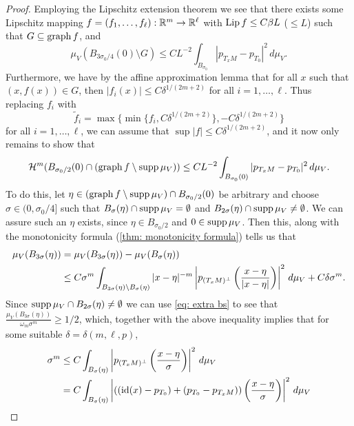 \begin{proof}
Employing the Lipschitz extension theorem we see that there exists some Lipschitz mapping $f=(f_1,\dots, f_{\ell}):\mathbb{R}^m \to \mathbb{R}^{\ell}$ with $\operatorname{Lip} f \le C\beta L$ ($\le L$) such that $G \subseteq \operatorname{graph} f$, and
\begin{equation}
    \mu_V(B_{3\sigma_0/4}(0) \setminus G) \le CL^{-2} \int_{B_{\sigma_0}} |p_{T_xM} - p_{T_0}|^2\, d\mu_V.\label{eq: final use}
\end{equation}
Furthermore, we have by the affine approximation lemma that for all $x$ such that $(x,f(x)) \in G$, then $|f_i(x)| \le C\delta^{1/(2m+2)}$ for all $i = 1, \dots, \ell$. Thus replacing $f_i$ with 
\[
    \tilde f_i = \max\{\min\{ f_i, C\delta^{1/(2m+2)} \}, -C\delta^{1/(2m+2)}\}
\]
for all $i = 1, \dots, \ell$, we can assume that $\sup|f| \le C\delta^{1/(2m+2)}$, and it now only remains to show that
\begin{equation}
    \mathcal{H}^m(B_{\sigma_0/2}(0) \cap (\operatorname{graph} f \setminus \operatorname{supp} \mu_V)) \le CL^{-2} \int_{B_{\sigma_0}(0) } |p_{T_xM} - p_{T_0}|^2\, d\mu_V.\label{eq: remains}
\end{equation}
To do this, let $\eta \in (\operatorname{graph} f \setminus \operatorname{supp} \mu_V) \cap B_{\sigma_0/2}(0)$ be arbitrary and choose $\sigma \in (0,\sigma_0/4]$ such that $B_{\sigma}(\eta) \cap \operatorname{supp} \mu_V = \emptyset$ and $B_{2\sigma}(\eta) \cap \operatorname{supp} \mu_V \neq \emptyset$.
We can assure such an $\eta$ exists, since $\eta \in B_{\sigma_0/2}$ and $0 \in \operatorname{supp} \mu_V$. 
Then this, along with the monotonicity formula (\cref{thm: monotonicity formula}) tells us that
\begin{align*}
    \mu_V(B_{3\sigma}(\eta)) &= \mu_V(B_{3\sigma}(\eta)) - \mu_V(B_{\sigma}(\eta)) \\
    &\le C\sigma^m \int_{ B_{3\sigma}(\eta)\setminus B_{\sigma}(\eta) } |x - \eta|^{-m} \left| p_{(T_xM)^{\perp}} \left( \frac{x - \eta}{|x - \eta|} \right)\right|^2\, d\mu_V + C\delta\sigma^m.
\end{align*}
Since $\operatorname{supp} \mu_V \cap B_{2\sigma}(\eta) \neq \emptyset$ we can use \eqref{eq: extra bs} to see that $\frac{\mu_V(B_{3\sigma}(\eta))}{\omega_m \sigma^m} \ge 1/2$, which, together with the above inequality implies that for some suitable $\delta=\delta(m,\ell,p)$,
\begin{align*}
    \sigma^m &\le C\int_{B_{\sigma}(\eta)} \left| p_{(T_xM)^{\perp}} \paren{\frac{x - \eta}{\sigma}} \right|^2\, d\mu_V \\
    &= C\int_{B_{\sigma}(\eta)} \left| ((\Id(x) - p_{T_0}) + (p_{T_0} - p_{T_xM})) \paren{\frac{x - \eta}{\sigma}} \right|^2\, d\mu_V \\

\end{align*}
\end{proof}
